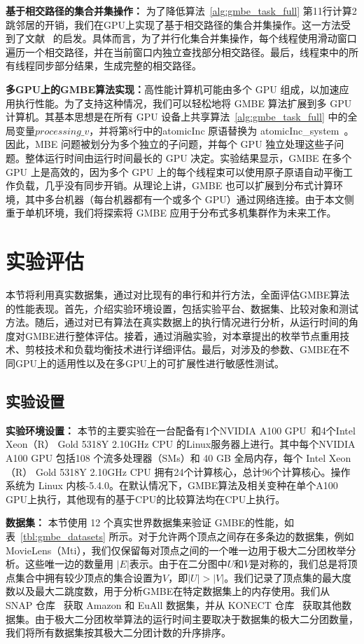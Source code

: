 \textbf{基于相交路径的集合并集操作：} 为了降低算法~\ref{alg:gmbe_task_full} 第11行计算2跳邻居的开销，我们在GPU上实现了基于相交路径的集合并集操作。这一方法受到了文献~\cite{GpuMergePathIntersect14} 的启发。具体而言，为了并行化集合并集操作，每个线程使用滑动窗口遍历一个相交路径，并在当前窗口内独立查找部分相交路径。最后，线程束中的所有线程同步部分结果，生成完整的相交路径。

\textbf{多GPU上的GMBE算法实现：}高性能计算机可能由多个 GPU 组成，以加速应用执行性能。为了支持这种情况，我们可以轻松地将 GMBE 算法扩展到多 GPU 计算机。其基本思想是在所有 GPU 设备上共享算法~\ref{alg:gmbe_task_full} 中的全局变量$processing\_v$，并将第8行中的\textsf{atomicInc} 原语替换为 \textsf{atomicInc\_system}~\cite{CUDAProgrammingGuide}。因此，MBE 问题被划分为多个独立的子问题，并每个 GPU 独立处理这些子问题。整体运行时间由运行时间最长的 GPU 决定。实验结果显示，GMBE 在多个 GPU 上是高效的，因为多个 GPU 上的每个线程束可以使用原子原语自动平衡工作负载，几乎没有同步开销。从理论上讲，GMBE 也可以扩展到分布式计算环境，其中多台机器（每台机器都有一个或多个 GPU）通过网络连接。由于本文侧重于单机环境，我们将探索将 GMBE 应用于分布式多机集群作为未来工作。


\section{实验评估}
本节将利用真实数据集，通过对比现有的串行和并行方法，全面评估GMBE算法的性能表现。首先，介绍实验环境设置，包括实验平台、数据集、比较对象和测试方法。随后，通过对已有算法在真实数据上的执行情况进行分析，从运行时间的角度对GMBE进行整体评估。接着，通过消融实验，对本章提出的枚举节点重用技术、剪枝技术和负载均衡技术进行详细评估。最后，对涉及的参数、GMBE在不同GPU上的适用性以及在多GPU上的可扩展性进行敏感性测试。

\subsection{实验设置}

\textbf{实验环境设置：} 本节的主要实验在一台配备有1个NVIDIA A100 GPU~\cite{NVIDIA-A100}和4个Intel Xeon（R） Gold 5318Y 2.10GHz CPU 的Linux服务器上进行。其中每个NVIDIA A100 GPU 包括108 个流多处理器（SMs）和 40 GB 全局内存，每个 Intel Xeon（R） Gold 5318Y 2.10GHz CPU 拥有24个计算核心，总计96个计算核心。操作系统为 Linux 内核-5.4.0。在默认情况下，GMBE算法及相关变种在单个A100 GPU上执行，其他现有的基于CPU的比较算法均在CPU上执行。



\textbf{数据集：} 本节使用 12 个真实世界数据集来验证 GMBE的性能，如表~\ref{tbl:gmbe_datasets} 所示。对于允许两个顶点之间存在多条边的数据集，例如 MovieLens（Mti），我们仅保留每对顶点之间的一个唯一边用于极大二分团枚举分析。这些唯一边的数量用 $|E|$表示。由于在二分图中$U$和$V$是对称的，我们总是将顶点集合中拥有较少顶点的集合设置为$V$，即$|U|>|V|$。我们记录了顶点集的最大度数以及最大二跳度数，用于分析GMBE在特定数据集上的内存使用。我们从 SNAP 仓库~\cite{snapnets} 获取 Amazon 和 EuAll 数据集，并从 KONECT 仓库~\cite{konect} 获取其他数据集。由于极大二分团枚举算法的运行时间主要取决于数据集的极大二分团数量，我们将所有数据集按其极大二分团计数的升序排序。%

